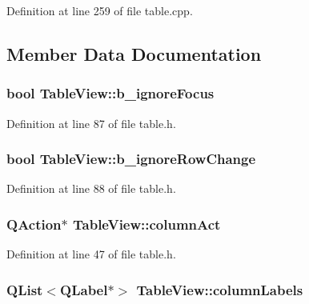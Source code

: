 Definition at line 259 of file table.cpp.



\subsection{Member Data Documentation}
\hypertarget{classTableView_a150be12afa3562146d290f26f10459b2}{
\subsubsection[{b\_\-ignoreFocus}]{\setlength{\rightskip}{0pt plus 5cm}bool {\bf TableView::b\_\-ignoreFocus}}}
\label{classTableView_a150be12afa3562146d290f26f10459b2}


Definition at line 87 of file table.h.

\hypertarget{classTableView_a20a7e1035a96ddde81059ce744099798}{
\subsubsection[{b\_\-ignoreRowChange}]{\setlength{\rightskip}{0pt plus 5cm}bool {\bf TableView::b\_\-ignoreRowChange}}}
\label{classTableView_a20a7e1035a96ddde81059ce744099798}


Definition at line 88 of file table.h.

\hypertarget{classTableView_a1808f7915f3db4bdea5fb535ecebda52}{
\subsubsection[{columnAct}]{\setlength{\rightskip}{0pt plus 5cm}QAction$\ast$ {\bf TableView::columnAct}}}
\label{classTableView_a1808f7915f3db4bdea5fb535ecebda52}


Definition at line 47 of file table.h.

\hypertarget{classTableView_a1160d50c2fd480dfd59b3d7660ef17b0}{
\subsubsection[{columnLabels}]{\setlength{\rightskip}{0pt plus 5cm}QList$<$QLabel$\ast$$>$ {\bf TableView::columnLabels}}}
\label{classTableView_a1160d50c2fd480dfd59b3d7660ef17b0}


